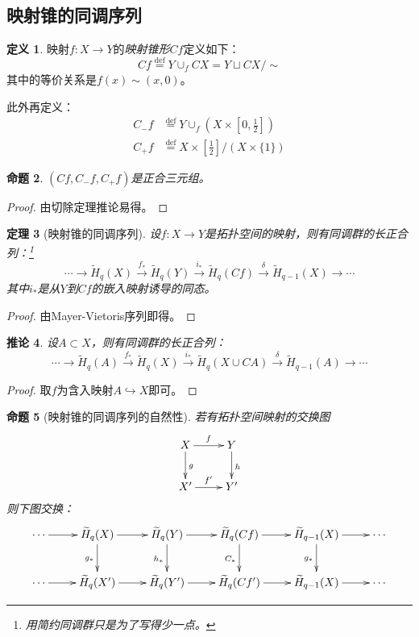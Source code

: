 \documentclass[UTF-8,11pt,fancyhdr,hyperref,titlepage]{ctexart}
\newcommand{\red}{\color{red}}
\theoremstyle{question}
\theoremstyle{theorem}
\newtheorem{thm}{定理}
\newtheorem{cor}[thm]{推论}
\newtheorem{prop}[thm]{命题}
\theoremstyle{definition}
\newtheorem{defn}[thm]{定义}
\theoremstyle{remark}
\def\longto{\longrightarrow}
\def\To{\longto}
\newcommand{\defeq}{\stackrel{{\mathrm{def}}}{=}}
\newcommand{\markar}[1]{\stackrel{{#1}}{\longrightarrow}}%
\newcommand{\rH}[1]{\widetilde{H}_{#1}}
\begin{document}
\subsection{映射锥的同调序列}
\begin{defn}
  映射$f\colon X\To Y$的\emph{\red 映射锥形}$Cf$定义如下：
  \begin{equation*}
    Cf\defeq Y\cup_fCX=Y\sqcup CX/\sim
  \end{equation*}
  其中的等价关系是$f(x)\sim(x,0)$。

  此外再定义：
  \begin{align*}
    C_{-}f &\defeq Y\cup_f(X\times [0,\frac{1}{2}])\\
    C_{+}f &\defeq X\times [\frac{1}{2}]/(X\times \{1\})
  \end{align*}
\end{defn}
\begin{prop}
  $(Cf,C_-f,C_+f)$是正合三元组。
\end{prop}
\begin{proof}
  由切除定理推论易得。
\end{proof}

\begin{thm}[{{\red 映射锥的同调序列}}]\label{映射锥}
  设$f\colon X\To Y$是拓扑空间的映射，则有同调群的长正合列：\footnote{用简约同调群只是为了写得少一点。}
  \begin{equation*}
    \cdots\To\rH{q}(X)\markar{f_{\ast}}\rH{q}(Y)\markar{i_{\ast}}\rH{q}(Cf)\markar{\delta}\rH{q-1}(X)\To\cdots
  \end{equation*}
  其中$i_{\ast}$是从$Y$到$Cf$的嵌入映射诱导的同态。
\end{thm}
\begin{proof}
  由Mayer-Vietoris序列即得。
\end{proof}
\begin{cor}
  设$A\subset X$，则有同调群的长正合列：
  \begin{equation*}
    \cdots\To\rH{q}(A)\markar{f_{\ast}}\rH{q}(X)\markar{i_{\ast}}\rH{q}(X\cup CA)\markar{\delta}\rH{q-1}(A)\To\cdots
  \end{equation*}
\end{cor}
\begin{proof}
  取$f$为含入映射$A\hookrightarrow X$即可。
\end{proof}

\begin{prop}[{{\red 映射锥的同调序列的自然性}}]\label{映射锥的自然性}
  若有拓扑空间映射的交换图
  \begin{displaymath}
    \xymatrix{
      X \ar[d]^{g} \ar[r]^{f} & Y \ar[d]^{h} \\
      X' \ar[r]^{f'} & Y'  }
  \end{displaymath}
  则下图交换：
  \begin{displaymath}
  \xymatrix{
    \cdots \ar[r] & \rH{q}(X) \ar[d]_{g_{\ast}} \ar[r] & \rH{q}(Y) \ar[d]_{h_{\ast}} \ar[r] & \rH{q}(Cf) \ar[d]_{C_{\ast}} \ar[r] & \rH{q-1}(X) \ar[d]_{g_{\ast}} \ar[r] & \cdots \\
    \cdots \ar[r] & \rH{q}(X') \ar[r] & \rH{q}(Y') \ar[r] & \rH{q}(Cf') \ar[r] & \rH{q-1}(X) \ar[r] & \cdots   }
  \end{displaymath}
\end{prop}
\end{document}
